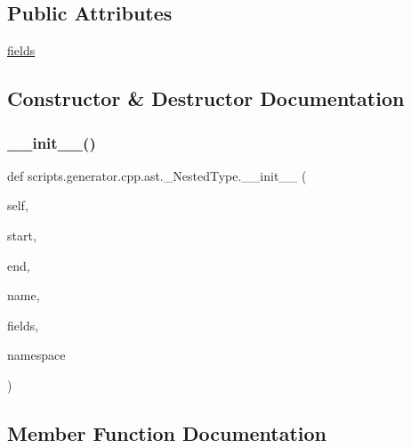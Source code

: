 \subsection*{Public Attributes}
\begin{DoxyCompactItemize}
\item 
\mbox{\hyperlink{classscripts_1_1generator_1_1cpp_1_1ast_1_1___nested_type_a62c40430cfb6c24a3c8c34a3a0d2b988}{fields}}
\end{DoxyCompactItemize}


\subsection{Constructor \& Destructor Documentation}
\mbox{\label{classscripts_1_1generator_1_1cpp_1_1ast_1_1___nested_type_ac225fc82e8af85a16caf4aa35d352750}} 
\subsubsection{\texorpdfstring{\_\_init\_\_()}{\_\_init\_\_()}}
{\footnotesize\ttfamily def scripts.\+generator.\+cpp.\+ast.\+\_\+\+Nested\+Type.\+\_\+\+\_\+init\+\_\+\+\_\+ (\begin{DoxyParamCaption}\item[{}]{self,  }\item[{}]{start,  }\item[{}]{end,  }\item[{}]{name,  }\item[{}]{fields,  }\item[{}]{namespace }\end{DoxyParamCaption})}



\subsection{Member Function Documentation}
\mbox{\label{classscripts_1_1generator_1_1cpp_1_1ast_1_1___nested_type_afcbd20c6a9835562bb752ee77ee8c192}} 
